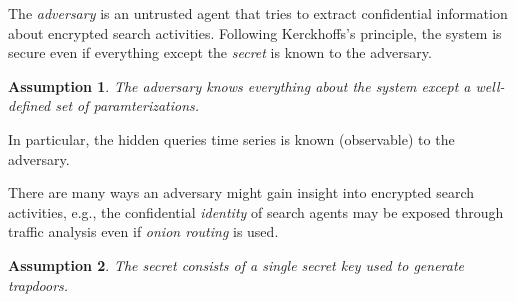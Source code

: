\documentclass[final,11pt]{article}
\numberwithin{equation}{section}
\theoremstyle{plain}
\newtheorem{assumption}{Assumption}[section]
\theoremstyle{remark}
\begin{document}
The \emph{adversary} is an untrusted agent that tries to extract confidential information about encrypted search activities. Following Kerckhoffs's principle, the system is secure even if everything except the \emph{secret} is known to the adversary.
\begin{assumption}
\label{asm:sec_params}
The adversary knows everything about the system except a well-defined set of paramterizations.
\end{assumption}
In particular, the hidden queries time series is known (observable) to the adversary.

There are many ways an adversary might gain insight into encrypted search activities, e.g., the confidential \emph{identity} of search agents may be exposed through traffic analysis even if \emph{onion routing} is used\cite{dingledine2004tor}.

%
%

\begin{assumption}
The secret consists of a single \emph{secret key} used to generate trapdoors.
\end{assumption}
\end{document}
